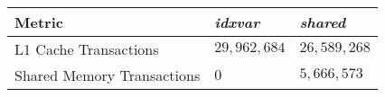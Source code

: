 \begin{table}
	\begin{center}
    \begin{tabular}{l l l}
        \hline
        \textbf{Metric} & \textbf{\emph{idxvar}} & \textbf{\emph{shared}} \\
        \hline
        \hline
        L1 Cache Transactions & $29,962,684$ & $26,589,268$ \\
        Shared Memory Transactions & $0$ & $5,666,573$ \\

\end{tabular}
\end{center}
\end{table}
